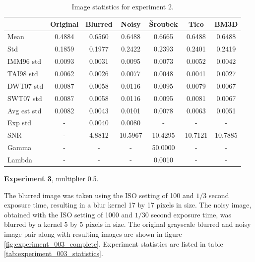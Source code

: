 \documentclass[12pt,notitlepage]{report}
\begin{document}
\begin{table}[htb]
  \centering
  \begin{tabular}{ | l | c | c | c | c | c | c | }
    \hline
		        & Original & Blurred & Noisy   & Šroubek & Tico    & BM3D    \\ \hline
	Mean        & 0.4884   & 0.6560  & 0.6488  & 0.6665  & 0.6488  & 0.6488  \\ \hline
	Std         & 0.1859   & 0.1977  & 0.2422  & 0.2393  & 0.2401  & 0.2419  \\ \hline
	IMM96 std   & 0.0093   & 0.0031  & 0.0095  & 0.0073  & 0.0052  & 0.0042  \\ \hline
	TAI98 std   & 0.0062   & 0.0026  & 0.0077  & 0.0048  & 0.0041  & 0.0027  \\ \hline
	DWT07 std   & 0.0087   & 0.0058  & 0.0116  & 0.0095  & 0.0079  & 0.0067  \\ \hline
	SWT07 std   & 0.0087   & 0.0058  & 0.0116  & 0.0095  & 0.0081  & 0.0067  \\ \hline
	Avg est std & 0.0082   & 0.0043  & 0.0101  & 0.0078  & 0.0063  & 0.0051  \\ \hline
	Exp std     & -        & 0.0040  & 0.0080  & -       & -       & -       \\ \hline
	SNR         & -        & 4.8812  & 10.5967 & 10.4295 & 10.7121 & 10.7885 \\ \hline
	Gamma       & -        & -       & -       & 50.0000 & -       & -       \\ \hline
	Lambda      & -        & -       & -       & 0.0010  & -       & -       \\ \hline

  \end{tabular}
  \caption{Image statistics for experiment 2.}
  \label{tab:experiment_002_statistics}
\end{table}

\noindent \textbf{Experiment 3}, multiplier 0.5.

The blurred image was taken using the ISO setting of 100 and $1/3$ second exposure time, resulting in a blur kernel 17 by 17 pixels in size. The noisy image, obtained with the ISO setting of 1000 and $1/30$ second exposure time, was blurred by a kernel 5 by 5 pixels in size. The original grayscale blurred and noisy image pair along with resulting images are shown in figure \ref{fig:experiment_003_complete}. Experiment statistics are listed in table \ref{tab:experiment_003_statistics}.
\end{document}
